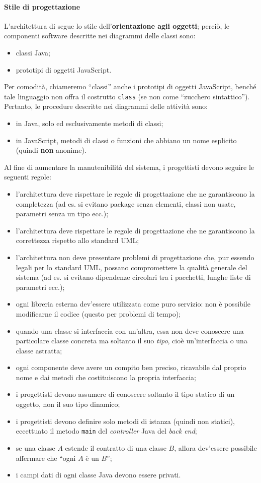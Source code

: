 \paragraph{Stile di progettazione} \label{sec:stile} L'architettura di \proj{} segue lo stile dell'\textbf{orientazione agli oggetti}; perciò, le componenti software descritte nei diagrammi delle classi sono:
\begin{itemize}
	\item classi Java;
	\item prototipi di oggetti JavaScript.
\end{itemize}
Per comodità, chiameremo “classi” anche i prototipi di oggetti JavaScript, benché tale linguaggio non offra il costrutto \texttt{class} (se non come “zucchero sintattico”). Pertanto, le procedure descritte nei diagrammi delle attività sono:
\begin{itemize}
	\item in Java, solo ed esclusivamente metodi di classi;
	\item in JavaScript, metodi di classi o funzioni che abbiano un nome esplicito (quindi \textbf{non} anonime).
\end{itemize}
Al fine di aumentare la manutenibilità del sistema, i progettisti devono seguire le seguenti regole:
\begin{itemize}
	\item l'architettura deve rispettare le regole di progettazione che ne garantiscono la completezza (ad es. si evitano package senza elementi, classi non usate, parametri senza un tipo ecc.);
	\item l'architettura deve rispettare le regole di progettazione che ne garantiscono la correttezza rispetto allo standard UML;
	\item l'architettura non deve presentare problemi di progettazione che, pur essendo legali per lo standard UML, possano compromettere la qualità generale del sistema (ad es. si evitano dipendenze circolari tra i pacchetti, lunghe liste di parametri ecc.);
	\item ogni libreria esterna dev'essere utilizzata come puro servizio: non è possibile modificarne il codice (questo per problemi di tempo);
	\item quando una classe si interfaccia con un'altra, essa non deve conoscere una particolare classe concreta ma soltanto il suo \emph{tipo}, cioè un'interfaccia o una classe astratta;
	\item ogni componente deve avere un compito ben preciso, ricavabile dal proprio nome e dai metodi che costituiscono la propria interfaccia;
	\item i progettisti devono assumere di conoscere soltanto il tipo statico di un oggetto, non il suo tipo dinamico;
	\item i progettisti devono definire solo metodi di istanza (quindi non statici), eccettuato il metodo \texttt{main} del \emph{controller} Java del \emph{back end};
	\item se una classe $A$ estende il contratto di una classe $B$, allora dev'essere possibile affermare che “ogni $A$ è un $B$”;
	\item i campi dati di ogni classe Java devono essere privati.
\end{itemize}

